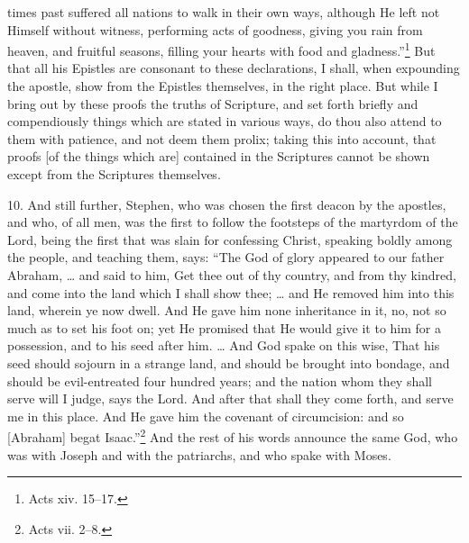 times past suffered all nations to walk in their own ways, although He left not Himself without witness, performing acts of goodness, giving you rain from heaven, and fruitful seasons, filling your hearts with food and gladness.”\footnote{Acts xiv. 15–17.} But that all his Epistles are consonant to these declarations, I shall, when expounding the apostle, show from the Epistles themselves, in the right place. But while I bring out by these proofs the truths of Scripture, and set forth briefly and compendiously things which are stated in various ways, do thou also attend to them with patience, and not deem them prolix; taking this into account, that proofs [of the things which are] contained in the Scriptures cannot be shown except from the Scriptures themselves.

10. And still further, Stephen, who was chosen the first deacon by the apostles, and who, of all men, was the first to follow the footsteps of the martyrdom of the Lord, being the first that was slain for confessing Christ, speaking boldly among the people, and teaching them, says: “The God of glory appeared to our father Abraham, … and said to him, Get thee out of thy country, and from thy kindred, and come into the land which I shall show thee; … and He removed him into this land, wherein ye now dwell. And He gave him none inheritance in it, no, not so much as to set his foot on; yet He promised that He would give it to him for a possession, and to his seed after him. … And God spake on this wise, That his seed should sojourn in a strange land, and should be brought into bondage, and should be evil-entreated four hundred years; and the nation whom they shall serve will I judge, says the Lord. And after that shall they come forth, and serve me in this place. And He gave him the covenant of circumcision: and so [Abraham] begat Isaac.”\footnote{Acts vii. 2–8.} And the rest of his words announce the same God, who was with Joseph and with the patriarchs, and who spake with Moses.

